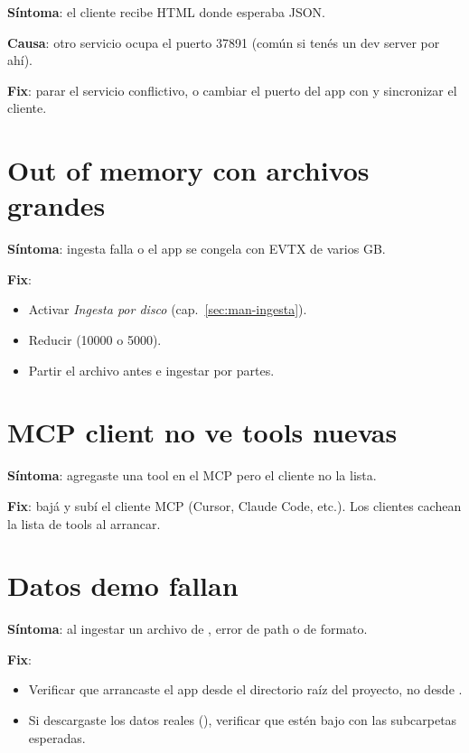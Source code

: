 \textbf{Síntoma}: el cliente recibe HTML donde esperaba JSON.

\textbf{Causa}: otro servicio ocupa el puerto 37891 (común si
tenés un dev server por ahí).

\textbf{Fix}: parar el servicio conflictivo, o cambiar el puerto
del app con  y sincronizar el
cliente.

\section{Out of memory con archivos grandes}

\textbf{Síntoma}: ingesta falla o el app se congela con EVTX de
varios GB.

\textbf{Fix}:

\begin{itemize}
    \item Activar \emph{Ingesta por disco}
    (cap.~\ref{sec:man-ingesta}).
    \item Reducir  (10000 o
    5000).
    \item Partir el archivo antes e ingestar por partes.
\end{itemize}

\section{MCP client no ve tools nuevas}

\textbf{Síntoma}: agregaste una tool en el MCP pero el cliente no
la lista.

\textbf{Fix}: bajá y subí el cliente MCP (Cursor, Claude Code,
etc.). Los clientes cachean la lista de tools al arrancar.

\section{Datos demo fallan}

\textbf{Síntoma}: al ingestar un archivo de ,
error de path o de formato.

\textbf{Fix}:

\begin{itemize}
    \item Verificar que arrancaste el app desde el directorio
    raíz del proyecto, no desde .
    \item Si descargaste los datos reales
    (), verificar que estén bajo
     con las subcarpetas esperadas.
\end{itemize}

